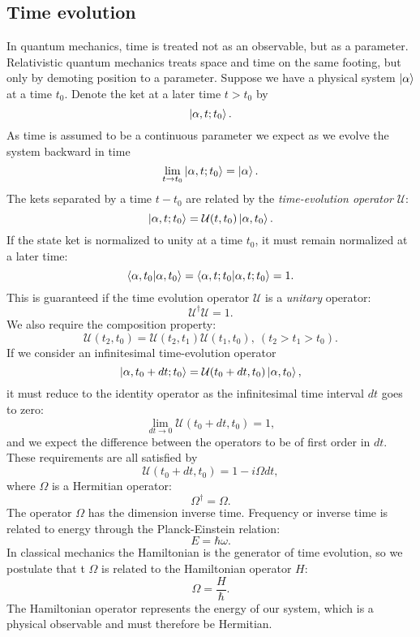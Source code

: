 \subsection{Time evolution}
In quantum mechanics, time is treated not as an observable,
but as a parameter. Relativistic quantum mechanics
treats space and time on the same footing, but only by demoting
position to a parameter.
\newline
Suppose we have a physical system $\ket{\alpha}$
at a time $t_0$. Denote the ket at a later time $t > t_0$ by
$$ \ket{\alpha, t; t_0} .$$
As time is assumed to be a continuous parameter we expect
as we evolve the system backward in time
$$ \lim_{t \rightarrow t_0} \ket{\alpha, t; t_0}
= \ket{\alpha} .$$
The kets separated by a time $t - t_0$
are related by the \textit{time-evolution operator} $\mathcal{U}$:
$$ \ket{\alpha, t; t_0} = \mathcal{U}(t, t_0) \ket{\alpha, t_0} .$$
If the state ket is normalized to unity at a time $t_0$,
it must remain normalized at a later time:
$$ \braket{\alpha, t_0 | \alpha, t_0} = \braket{\alpha, t; t_0
    | \alpha, t; t_0} = 1 .$$
This is guaranteed if the time evolution operator 
$\mathcal{U}$ is a \textit{unitary} operator:
$$ \mathcal{U}^{\dagger} \mathcal{U} = 1 .$$
We also require the composition property:
$$ \mathcal{U}(t_2, t_0) = \mathcal{U}(t_2, t_1)
    \mathcal{U}(t_1, t_0), ~ (t_2 > t_1 > t_0) .$$
\newline
If we consider an infinitesimal time-evolution operator
$$ \ket{\alpha, t_0 + dt; t_0} = \mathcal{U}(t_0 + dt, t_0)
\ket{\alpha, t_0} ,$$
it must reduce to the identity operator as the infinitesimal
time interval $dt$ goes to zero:
$$ \lim_{dt \rightarrow 0} \mathcal{U}(t_0 + dt, t_0) = 1, $$
and we expect the difference between the operators
to be of first order in $dt$.
\newline
These requirements are all satisfied by
$$ \mathcal{U}(t_0 + dt, t_0) = 1 - i\Omega dt ,$$
where $\Omega$ is a Hermitian operator:
$$ \Omega^{\dagger} = \Omega .$$
The operator $\Omega$ has the dimension inverse time.
Frequency or inverse time is related to energy
through the Planck-Einstein relation:
$$ E = \hbar \omega .$$
In classical mechanics the Hamiltonian is the generator of time evolution,
so we postulate that t $\Omega$ is related to the Hamiltonian operator
$H$:
$$ \Omega = \frac{H}{\hbar} .$$
The Hamiltonian operator represents the energy of our system,
which is a physical observable and must therefore be Hermitian.

